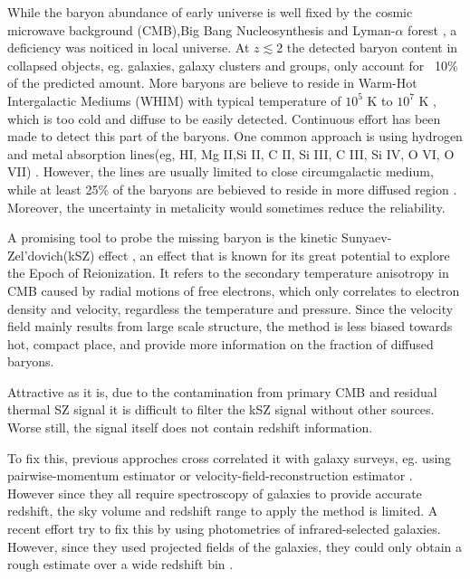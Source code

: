 While the baryon abundance of early universe is well fixed by the cosmic microwave background (CMB),Big Bang Nucleosynthesis and Lyman-$\alpha$ forest \cite{Cooke14}\cite{Fukugita98}\cite{Komatsu11}\cite{Hinshaw13}, 
a deficiency was noiticed in local universe.
At $z\lesssim 2$ the detected baryon content in collapsed
objects, eg. galaxies, galaxy clusters and groups, only account for ~10$\%$ of the predicted amount.
More baryons are believe to reside in Warm-Hot Intergalactic Mediums (WHIM) with typical temperature of $10^5$ K to $10^7$ K \cite{Soltan06}, which is too cold and diffuse to be easily detected.
Continuous effort has been made to detect this part of the baryons. 
One common approach is using hydrogen and metal absorption lines(eg, HI, Mg II,Si II, C II, Si III, C III, Si IV, O VI, O VII) \cite{Fukugita04}\cite{Werk14}.
However, the lines are usually limited to close circumgalactic medium, while at least 25\% of the baryons are bebieved to reside in more diffused region \cite{Dave10}. Moreover, the uncertainty in metalicity would sometimes reduce the reliability.

A promising tool to probe the missing baryon is the kinetic Sunyaev-Zel'dovich(kSZ) effect \cite{Sunyaev72}\cite{Sunyaev80}, 
  an effect that is known for its great potential to explore the Epoch of Reionization. 
It refers to the secondary temperature anisotropy in CMB caused by radial motions of free electrons, 
  which only correlates to electron density and velocity, 
regardless the temperature and pressure. 
Since the velocity field mainly results from large scale structure, 
the method is less biased towards hot, compact place, 
and provide more information on the fraction of diffused baryons.

Attractive as it is, 
due to the contamination from primary CMB and residual thermal SZ signal
it is difficult to filter the kSZ signal without other sources. 
Worse still, the signal itself does not contain redshift information.

To fix this, previous approches cross correlated it with galaxy surveys, 
eg. using pairwise-momentum estimator \cite{Hand12} or velocity-field-reconstruction estimator \cite{Shao11}\cite{Li14}. 
However since they all require spectroscopy of galaxies to provide accurate redshift, the sky volume and redshift range to apply the method is limited. 
A recent effort try to fix this by using photometries of infrared-selected galaxies. 
However, since they used projected fields of the galaxies, they could only obtain a rough estimate over a wide redshift bin \cite{Hill16}.


